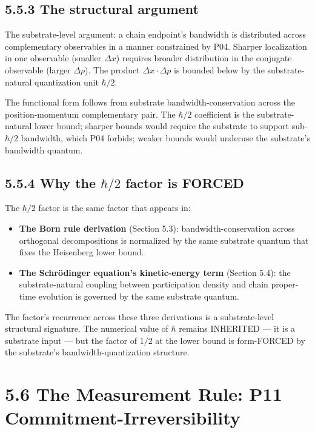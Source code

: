 \documentclass[11pt]{book}
\begin{document}
\subsection{5.5.3 The structural argument}

The substrate-level argument: a chain endpoint's bandwidth is distributed across complementary observables in a manner constrained by P04. Sharper localization in one observable (smaller $\Delta x$) requires broader distribution in the conjugate observable (larger $\Delta p$). The product $\Delta x \cdot \Delta p$ is bounded below by the substrate-natural quantization unit $\hbar/2$.

The functional form follows from substrate bandwidth-conservation across the position-momentum complementary pair. The $\hbar/2$ coefficient is the substrate-natural lower bound; sharper bounds would require the substrate to support sub-$\hbar/2$ bandwidth, which P04 forbids; weaker bounds would underuse the substrate's bandwidth quantum.

\subsection{5.5.4 Why the $\hbar/2$ factor is FORCED}

The $\hbar/2$ factor is the same factor that appears in:

\begin{itemize}
\item \textbf{The Born rule derivation} (Section 5.3): bandwidth-conservation across orthogonal decompositions is normalized by the same substrate quantum that fixes the Heisenberg lower bound.
\item \textbf{The Schrödinger equation's kinetic-energy term} (Section 5.4): the substrate-natural coupling between participation density and chain proper-time evolution is governed by the same substrate quantum.
\end{itemize}

The factor's recurrence across these three derivations is a substrate-level structural signature. The numerical value of $\hbar$ remains INHERITED — it is a substrate input — but the factor of $1/2$ at the lower bound is form-FORCED by the substrate's bandwidth-quantization structure.

\section{5.6 The Measurement Rule: P11 Commitment-Irreversibility}
\end{document}
